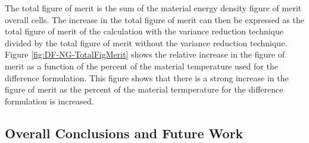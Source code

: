 	The total figure of merit is the sum of the material energy density figure of merit overall cells. The increase in the total figure of merit can then be expressed as the total figure of merit of the calculation with the variance reduction technique divided by the total figure of merit without the variance reduction technique. Figure \ref{fig:DF-NG-TotalFigMerit} shows the relative increase in the figure of merit as a function of the percent of the material temperature used for the difference formulation. This figure shows that there is a strong increase in the figure of merit as the percent of the material termperature for the difference formulation is increased. 


\belowSubSecSkip
\subsection{Overall Conclusions and Future Work}
\label{sec:Conclusions-over}


